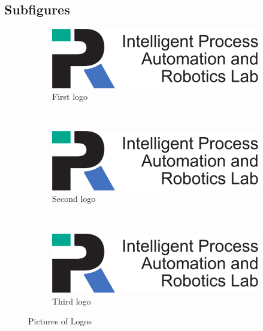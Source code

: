 \subsection{Subfigures}
\begin{figure}[H]
    \centering
    \begin{subfigure}[b]{0.3\textwidth}
        \includegraphics[width=\textwidth]{Logos/KIT-Departments/IPRLogo_en}
        \caption{First logo}
        \label{fig:logo1}
    \end{subfigure}
    ~ %
    \begin{subfigure}[b]{0.3\textwidth}
        \includegraphics[width=\textwidth]{Logos/KIT-Departments/IPRLogo_en}
        \caption{Second logo}
        \label{fig:logo2}
    \end{subfigure}
    ~ %
    \begin{subfigure}[b]{0.3\textwidth}
        \includegraphics[width=\textwidth]{Logos/KIT-Departments/IPRLogo_en}
        \caption{Third logo}
        \label{fig:logo3}
    \end{subfigure}
    \caption{Pictures of Logos}\label{fig:logos}
\end{figure}


